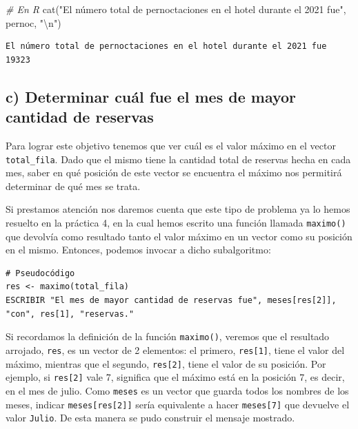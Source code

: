 \documentclass[
]{book}
\newenvironment{Shaded}{\begin{snugshade}}{\end{snugshade}}
\newcommand{\CommentTok}[1]{\textcolor[rgb]{0.56,0.35,0.01}{\textit{#1}}}
\newcommand{\FunctionTok}[1]{\textcolor[rgb]{0.00,0.00,0.00}{#1}}
\newcommand{\NormalTok}[1]{#1}
\newcommand{\SpecialCharTok}[1]{\textcolor[rgb]{0.00,0.00,0.00}{#1}}
\newcommand{\StringTok}[1]{\textcolor[rgb]{0.31,0.60,0.02}{#1}}
\begin{document}
\begin{Shaded}
\begin{Highlighting}[]
\CommentTok{\# En R}
\FunctionTok{cat}\NormalTok{(}\StringTok{"El número total de pernoctaciones en el hotel durante el 2021 fue"}\NormalTok{, pernoc, }\StringTok{"}\SpecialCharTok{\textbackslash{}n}\StringTok{"}\NormalTok{)}
\end{Highlighting}
\end{Shaded}

\begin{verbatim}
El número total de pernoctaciones en el hotel durante el 2021 fue 19323 
\end{verbatim}

\hypertarget{c-determinar-cuuxe1l-fue-el-mes-de-mayor-cantidad-de-reservas}{%
\subsection{c) Determinar cuál fue el mes de mayor cantidad de reservas}\label{c-determinar-cuuxe1l-fue-el-mes-de-mayor-cantidad-de-reservas}}

Para lograr este objetivo tenemos que ver cuál es el valor máximo en el vector \texttt{total\_fila}. Dado que el mismo tiene la cantidad total de reservas hecha en cada mes, saber en qué posición de este vector se encuentra el máximo nos permitirá determinar de qué mes se trata.

Si prestamos atención nos daremos cuenta que este tipo de problema ya lo hemos resuelto en la práctica 4, en la cual hemos escrito una función llamada \texttt{maximo()} que devolvía como resultado tanto el valor máximo en un vector como su posición en el mismo. Entonces, podemos invocar a dicho subalgoritmo:

\begin{verbatim}
# Pseudocódigo
res <- maximo(total_fila)
ESCRIBIR "El mes de mayor cantidad de reservas fue", meses[res[2]], "con", res[1], "reservas."
\end{verbatim}

Si recordamos la definición de la función \texttt{maximo()}, veremos que el resultado arrojado, \texttt{res}, es un vector de 2 elementos: el primero, \texttt{res{[}1{]}}, tiene el valor del máximo, mientras que el segundo, \texttt{res{[}2{]}}, tiene el valor de su posición. Por ejemplo, si \texttt{res{[}2{]}} vale 7, significa que el máximo está en la posición 7, es decir, en el mes de julio. Como \texttt{meses} es un vector que guarda todos los nombres de los meses, indicar \texttt{meses{[}res{[}2{]}{]}} sería equivalente a hacer \texttt{meses{[}7{]}} que devuelve el valor \texttt{Julio}. De esta manera se pudo construir el mensaje mostrado.
\end{document}
